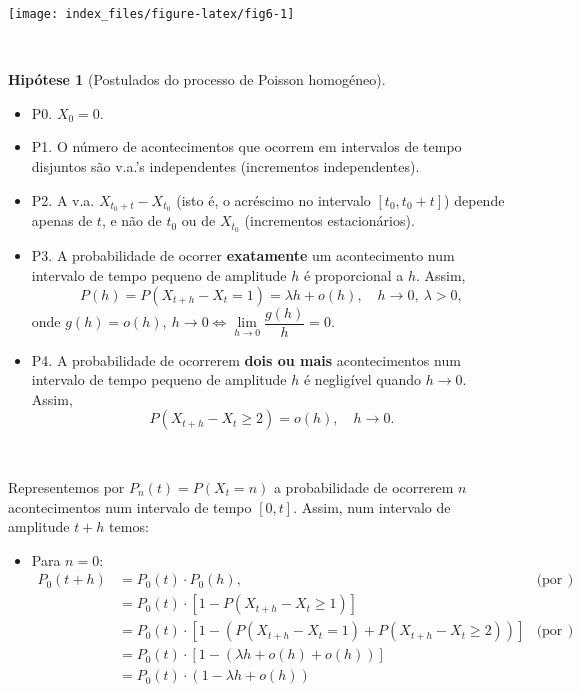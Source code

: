 \documentclass[
  11pt,
  a4paper,
]{book}
\providecommand{\tightlist}{%
  \setlength{\itemsep}{0pt}\setlength{\parskip}{0pt}}
\theoremstyle{definition}
\theoremstyle{definition}
\theoremstyle{definition}
\theoremstyle{definition}
\newtheorem{hypothesis}{Hipótese}[chapter]
\theoremstyle{remark}
\begin{document}
\begin{center}\texttt{[image: index\_files/figure-latex/fig6-1]} \end{center}

\(\,\)

\begin{hypothesis}[Postulados do processo de Poisson homogéneo]
\leavevmode

\begin{itemize}
\item
  P0. \(X_0=0\).
\item
  P1. O número de acontecimentos que ocorrem em intervalos de tempo disjuntos são v.a.'s independentes (incrementos independentes).
\item
  P2. A v.a. \(X_{t_0+t}-X_{t_0}\) (isto é, o acréscimo no intervalo \([t_0,t_0+t]\)) depende apenas de \(t\), e não de \(t_0\) ou de \(X_{t_0}\) (incrementos estacionários).
\item
  P3. A probabilidade de ocorrer \textbf{exatamente} um acontecimento num intervalo de tempo pequeno de amplitude \(h\) é proporcional a \(h\). Assim,
  \[P(h)=P(X_{t+h}-X_t=1)=\lambda h + o(h), \quad h \to 0, ~\lambda >0,\]
  onde \(g(h)=o(h), ~h \to 0 \iff \lim\limits_{h \to 0}\dfrac{g(h)}{h}=0.\)
\item
  P4. A probabilidade de ocorrerem \textbf{dois ou mais} acontecimentos num intervalo de tempo pequeno de amplitude \(h\) é negligível quando \(h \to 0\). Assim,
  \[P(X_{t+h}-X_t \geq 2)=o(h), \quad h \to 0.\]
\end{itemize}

\end{hypothesis}

\(\,\)

Representemos por \(P_n(t)=P(X_t=n)\) a probabilidade de ocorrerem \(n\) acontecimentos num intervalo de tempo \([0,t]\). Assim, num intervalo de amplitude \(t+h\) temos:

\begin{itemize}
\tightlist
\item
  Para \(n=0\):
  \begin{align*}
  P_0(t+h) &= P_0(t) \cdot P_{0}(h), & \text{(por P1})\\
         &= P_0(t) \cdot [1-P(X_{t+h}-X_t \geq 1)] & \\
         &= P_0(t) \cdot [1-(P(X_{t+h}-X_t =1)+P(X_{t+h}-X_t \geq 2))] & \text{(por P3 e P4})\\
         &= P_0(t) \cdot [1-(\lambda h + o(h)+o(h))] & \\
         &= P_0(t) \cdot (1-\lambda h + o(h)) & 
  \end{align*}
\end{itemize}
\end{document}
